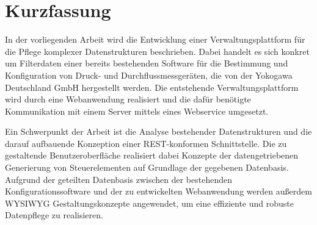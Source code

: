 \chapter*{Kurzfassung}

In der vorliegenden Arbeit wird die Entwicklung einer Verwaltungsplattform für die Pflege komplexer Datenstrukturen beschrieben. Dabei handelt es sich konkret um Filterdaten einer bereits bestehenden Software für die Bestimmung und Konfiguration von Druck- und Durchflussmessgeräten, die von der Yokogawa Deutschland GmbH hergestellt werden. Die entstehende Verwaltungsplattform wird durch eine Webanwendung realisiert und die dafür benötigte Kommunikation mit einem Server mittels eines Webservice umgesetzt.

Ein Schwerpunkt der Arbeit ist die Analyse bestehender Datenstrukturen und die darauf aufbauende Konzeption einer REST-konformen Schnittstelle. Die zu gestaltende Benutzeroberfläche realisiert dabei Konzepte der datengetriebenen Generierung von Steuerelementen auf Grundlage der gegebenen Datenbasis. Aufgrund der geteilten Datenbasis zwischen der bestehenden Konfigurationssoftware und der zu entwickelten Webanwendung werden außerdem \acf{WYSIWYG} Gestaltungskonzepte angewendet, um eine effiziente und robuste Datenpflege zu realisieren.


